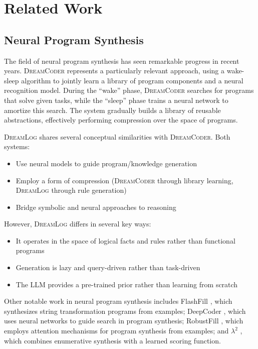 \documentclass[11pt,a4paper]{article}
\newcommand{\dreamlog}{\textsc{DreamLog}}
\newcommand{\dreamcoder}{\textsc{DreamCoder}}
\begin{document}
\section{Related Work}

\subsection{Neural Program Synthesis}

The field of neural program synthesis has seen remarkable progress in recent years. \dreamcoder{} \citep{ellis2021dreamcoder} represents a particularly relevant approach, using a wake-sleep algorithm to jointly learn a library of program components and a neural recognition model. During the ``wake'' phase, \dreamcoder{} searches for programs that solve given tasks, while the ``sleep'' phase trains a neural network to amortize this search. The system gradually builds a library of reusable abstractions, effectively performing compression over the space of programs.

\dreamlog{} shares several conceptual similarities with \dreamcoder{}. Both systems:
\begin{itemize}
\item Use neural models to guide program/knowledge generation
\item Employ a form of compression (\dreamcoder{} through library learning, \dreamlog{} through rule generation)
\item Bridge symbolic and neural approaches to reasoning
\end{itemize}

However, \dreamlog{} differs in several key ways:
\begin{itemize}
\item It operates in the space of logical facts and rules rather than functional programs
\item Generation is lazy and query-driven rather than task-driven
\item The LLM provides a pre-trained prior rather than learning from scratch
\end{itemize}

Other notable work in neural program synthesis includes FlashFill \citep{gulwani2011automating}, which synthesizes string transformation programs from examples; DeepCoder \citep{balog2017deepcoder}, which uses neural networks to guide search in program synthesis; RobustFill \citep{devlin2017robustfill}, which employs attention mechanisms for program synthesis from examples; and $\lambda^2$ \citep{feser2015synthesizing}, which combines enumerative synthesis with a learned scoring function.
\end{document}
